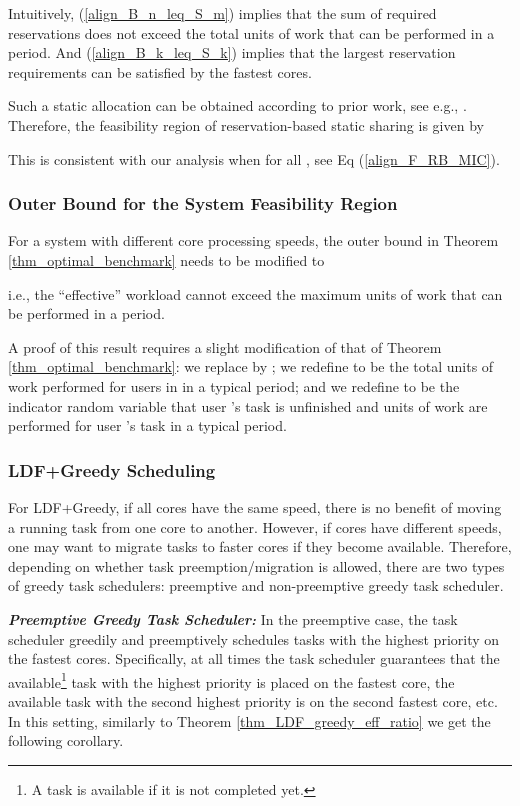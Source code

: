 \documentclass[prodmode,acmtompecs]{acmsmall}
\begin{document}
Intuitively, (\ref{align_B_n_leq_S_m}) implies that the sum of required reservations does not exceed the total units of work that can be performed in a period. 
And (\ref{align_B_k_leq_S_k}) implies that the  largest reservation requirements can be satisfied by the  fastest cores. 

Such a static allocation can be obtained according to prior work, see e.g., \cite{FGB01,FuM09}. 
Therefore, the feasibility region of reservation-based static sharing  is given by

This is consistent with our analysis when  for all , see Eq (\ref{align_F_RB_MIC}). 

\subsubsection{Outer Bound  for the System Feasibility Region}

For a system with different core processing speeds, the outer bound  in Theorem \ref{thm_optimal_benchmark} needs to be modified to

i.e., the ``effective'' workload  cannot exceed the maximum units of work  that can be performed in a period. 

A proof of this result requires a slight modification of that of Theorem \ref{thm_optimal_benchmark}: we replace  by ; we redefine  to be the total units of work performed for users in  in a typical period; and we redefine  to be the indicator random variable that user 's task is unfinished and  units of work are performed for user 's task in a typical period. 

\subsubsection{LDF+Greedy Scheduling}

For LDF+Greedy, if all cores have the same speed, there is no benefit of moving a running task from one core to another. 
However, if cores have different speeds, one may want to migrate tasks to faster cores if they become available. 
Therefore, depending on whether task preemption/migration is allowed, there are two types of greedy task schedulers: 
preemptive and non-preemptive greedy task scheduler. 

{\bf \em Preemptive Greedy Task Scheduler: }
In the preemptive case, the task scheduler greedily and preemptively schedules tasks with the highest priority on the fastest cores. Specifically, at all times the task scheduler guarantees that the available\footnote{A task is available if it is not completed yet. } task with the highest priority is placed on the fastest core, the available task with the second highest priority is on the second fastest core, etc. 
In this setting, similarly to Theorem \ref{thm_LDF_greedy_eff_ratio} we get the following corollary. 
\end{document}
